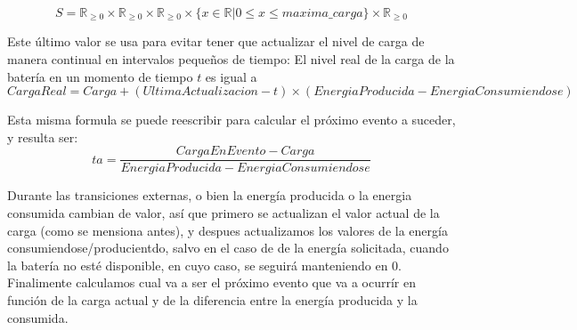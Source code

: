 $$S = \mathbb{R}_{\geq 0} \times \mathbb{R}_{\geq 0} \times \mathbb{R}_{\geq 0} \times \{x \in \mathbb{R} | 0 \leq x \leq maxima\_carga \} \times \mathbb{R}_{\geq 0}$$

Este último valor se usa para evitar tener que actualizar el nivel de carga
de manera continual en intervalos pequeños de tiempo: El nivel real de la carga de
la batería en un momento de tiempo $t$ es igual a \\
$$CargaReal = Carga+(UltimaActualizacion - t)\times(EnergiaProducida - EnergiaConsumiendose)$$

Esta misma formula se puede reescribir para calcular el próximo evento a suceder,
y resulta ser:
$$ta = \frac{CargaEnEvento - Carga}{EnergiaProducida - EnergiaConsumiendose}$$



Durante las transiciones externas, o bien la energía producida o la energia consumida
cambian de valor, así que primero se actualizan el valor actual de la carga (como se mensiona antes),
y despues actualizamos los valores de la energía consumiendose/producientdo, salvo en el caso de 
de la energía solicitada, cuando la batería no esté disponible, en cuyo caso, se seguirá manteniendo en 0.
Finalimente calculamos cual va a ser el próximo evento que va a ocurrír en función de la
carga actual y de la diferencia entre la energía producida y la consumida.

